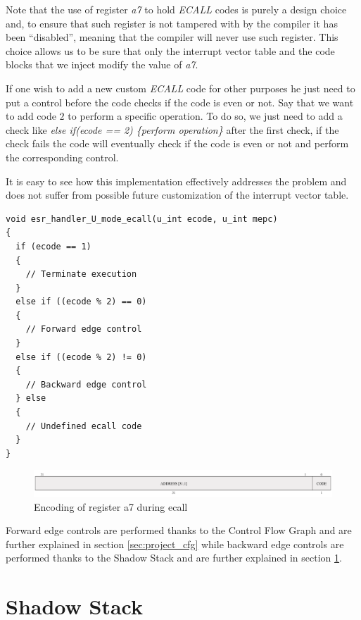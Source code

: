 Note that the use of register \textit{a7} to hold \textit{ECALL} codes is purely
a design choice and, to ensure that such register is not tampered with by the
compiler it has been ``disabled'', meaning that the compiler will never use such
register. This choice allows us to be sure that only the interrupt vector table
and the code blocks that we inject modify the value of \textit{a7}.

If one wish to add a new custom \textit{ECALL} code for other purposes he just
need to put a control before the code checks if the code is even or not. Say that
we want to add code $2$ to perform a specific operation. To do so, we just need to
add a check like \textit{else if(ecode == 2) \{perform operation\}} after the
first check, if the check fails the code will eventually check if the code is even
or not and perform the corresponding control.

It is easy to see how this implementation effectively addresses the problem and does
not suffer from possible future customization of the interrupt vector table.

\begin{lstlisting}[style=CStyle, caption = U-mode \textit{ECALL} handler, label={lst:ecallhandler}]
void esr_handler_U_mode_ecall(u_int ecode, u_int mepc)
{
  if (ecode == 1)
  {
    // Terminate execution
  }
  else if ((ecode % 2) == 0)
  {
    // Forward edge control
  }
  else if ((ecode % 2) != 0)
  {
    // Backward edge control
  } else
  {
    // Undefined ecall code
  }
}
\end{lstlisting}

\begin{figure}[htbp]
  \centering
  \includegraphics[width=.9\linewidth]{images/ecall_code.png}
  \caption{Encoding of register a7 during ecall}
  \label{fig:ecall}
\end{figure}

Forward edge controls are performed thanks to the Control Flow Graph and are further
explained in section \ref{sec:project_cfg} while backward edge controls are performed
thanks to the Shadow Stack and are further explained in section \ref{sec:project_ss}.

\section{Shadow Stack}
\label{sec:project_ss}

